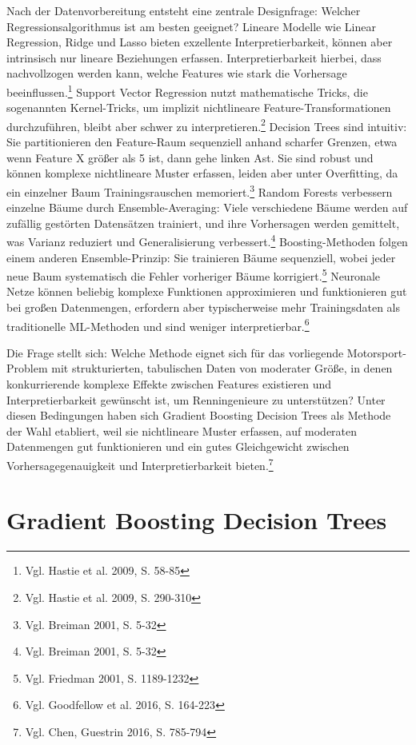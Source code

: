Nach der Datenvorbereitung entsteht eine zentrale Designfrage: Welcher Regressionsalgorithmus ist am besten geeignet? Lineare Modelle wie Linear Regression, Ridge und Lasso bieten exzellente Interpretierbarkeit, können aber intrinsisch nur lineare Beziehungen erfassen. Interpretierbarkeit hierbei, dass nachvollzogen werden kann, welche Features wie stark die Vorhersage beeinflussen.\footnote{Vgl. Hastie et al. 2009, S. 58-85} Support Vector Regression nutzt mathematische Tricks, die sogenannten Kernel-Tricks, um implizit nichtlineare Feature-Transformationen durchzuführen, bleibt aber schwer zu interpretieren.\footnote{Vgl. Hastie et al. 2009, S. 290-310} Decision Trees sind intuitiv: Sie partitionieren den Feature-Raum sequenziell anhand scharfer Grenzen, etwa wenn Feature X größer als 5 ist, dann gehe linken Ast. Sie sind robust und können komplexe nichtlineare Muster erfassen, leiden aber unter Overfitting, da ein einzelner Baum Trainingsrauschen memoriert.\footnote{Vgl. Breiman 2001, S. 5-32} Random Forests verbessern einzelne Bäume durch Ensemble-Averaging: Viele verschiedene Bäume werden auf zufällig gestörten Datensätzen trainiert, und ihre Vorhersagen werden gemittelt, was Varianz reduziert und Generalisierung verbessert.\footnote{Vgl. Breiman 2001, S. 5-32} Boosting-Methoden folgen einem anderen Ensemble-Prinzip: Sie trainieren Bäume sequenziell, wobei jeder neue Baum systematisch die Fehler vorheriger Bäume korrigiert.\footnote{Vgl. Friedman 2001, S. 1189-1232} Neuronale Netze können beliebig komplexe Funktionen approximieren und funktionieren gut bei großen Datenmengen, erfordern aber typischerweise mehr Trainingsdaten als traditionelle \ac{ML}-Methoden und sind weniger interpretierbar.\footnote{Vgl. Goodfellow et al. 2016, S. 164-223}

Die Frage stellt sich: Welche Methode eignet sich für das vorliegende Motorsport-Problem mit strukturierten, tabulischen Daten von moderater Größe, in denen konkurrierende komplexe Effekte zwischen Features existieren und Interpretierbarkeit gewünscht ist, um Renningenieure zu unterstützen? Unter diesen Bedingungen haben sich Gradient Boosting Decision Trees als Methode der Wahl etabliert, weil sie nichtlineare Muster erfassen, auf moderaten Datenmengen gut funktionieren und ein gutes Gleichgewicht zwischen Vorhersagegenauigkeit und Interpretierbarkeit bieten.\footnote{Vgl. Chen, Guestrin 2016, S. 785-794}



\section{Gradient Boosting Decision Trees}

